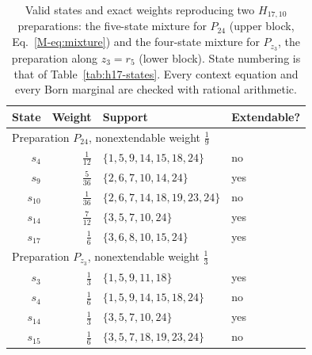 \documentclass[aps,pra,reprint,superscriptaddress,longbibliography,nofootinbib,floatfix,10pt]{revtex4-2}
\theoremstyle{definition}
\begin{document}
\begin{table}[t]\centering\small\setlength{\tabcolsep}{3pt}\renewcommand{\arraystretch}{1.25}
\caption{Valid states and exact weights reproducing two $H_{17,10}$ preparations: the five-state mixture for $P_{24}$ (upper block, Eq.~\eqref{M-eq:mixture}) and the four-state mixture for $P_{z_3}$, the preparation along $z_3=r_5$ (lower block). State numbering is that of Table~\ref{tab:h17-states}. Every context equation and every Born marginal are checked with rational arithmetic.}\label{tab:quantum}
\begin{tabular}{rrp{.61\linewidth}l}\toprule
State & Weight & Support & Extendable?\\\midrule
\multicolumn{4}{l}{Preparation $P_{24}$, nonextendable weight $\frac{1}{9}$}\\
$s_{4}$ & $\frac{1}{12}$ & $\{1,\allowbreak 5,\allowbreak 9,\allowbreak 14,\allowbreak 15,\allowbreak 18,\allowbreak 24\}$ & no\\
$s_{9}$ & $\frac{5}{36}$ & $\{2,\allowbreak 6,\allowbreak 7,\allowbreak 10,\allowbreak 14,\allowbreak 24\}$ & yes\\
$s_{10}$ & $\frac{1}{36}$ & $\{2,\allowbreak 6,\allowbreak 7,\allowbreak 14,\allowbreak 18,\allowbreak 19,\allowbreak 23,\allowbreak 24\}$ & no\\
$s_{14}$ & $\frac{7}{12}$ & $\{3,\allowbreak 5,\allowbreak 7,\allowbreak 10,\allowbreak 24\}$ & yes\\
$s_{17}$ & $\frac{1}{6}$ & $\{3,\allowbreak 6,\allowbreak 8,\allowbreak 10,\allowbreak 15,\allowbreak 24\}$ & yes\\
\midrule
\multicolumn{4}{l}{Preparation $P_{z_3}$, nonextendable weight $\frac{1}{3}$}\\
$s_{3}$ & $\frac{1}{3}$ & $\{1,\allowbreak 5,\allowbreak 9,\allowbreak 11,\allowbreak 18\}$ & yes\\
$s_{4}$ & $\frac{1}{6}$ & $\{1,\allowbreak 5,\allowbreak 9,\allowbreak 14,\allowbreak 15,\allowbreak 18,\allowbreak 24\}$ & no\\
$s_{14}$ & $\frac{1}{3}$ & $\{3,\allowbreak 5,\allowbreak 7,\allowbreak 10,\allowbreak 24\}$ & yes\\
$s_{15}$ & $\frac{1}{6}$ & $\{3,\allowbreak 5,\allowbreak 7,\allowbreak 18,\allowbreak 19,\allowbreak 23,\allowbreak 24\}$ & no\\
\bottomrule\end{tabular}\end{table}
\end{document}

